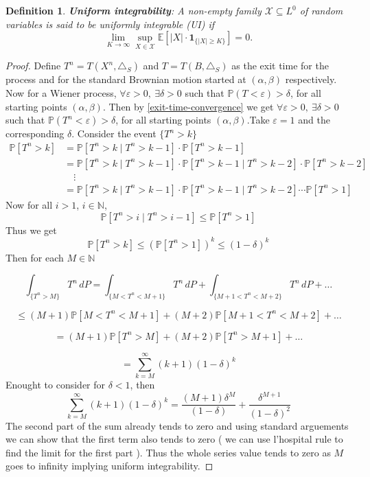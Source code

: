 \documentclass[11pt, a4paper, oneside]{report}
\numberwithin{equation}{section}
\newtheorem{definition}[theorem]{Definition}
\begin{document}
\begin{definition}
\textbf{Uniform integrability}:  
A non-empty family \( \mathcal{X} \subseteq L^0 \)  
of random variables is said to be \emph{uniformly integrable (UI)} if
\[
\lim_{K \to \infty} \sup_{X \in \mathcal{X}} \mathbb{E}\left[ |X| \cdot \mathbf{1}_{\{|X| \geq K\}} \right] = 0.
\]

\end{definition}
\begin{proof}
Define \(T^n=T(X^n,\triangle_S)\) and \(T=T(B,\triangle_S)\) as the exit time for the process and for the standard Brownian motion started at $(\alpha,\beta)$ respectively. Now for a Wiener process, \( \forall \varepsilon > 0, \ \exists \delta > 0 \) such that  
\( \mathbb{P}(T < \varepsilon) > \delta \),  
for all starting points \( (\alpha, \beta) \).
 Then by \ref{exit-time-convergence} we get \( \forall \varepsilon > 0, \ \exists \delta > 0 \) such that \( \mathbb{P}(T^n < \varepsilon) > \delta \), for all starting points \( (\alpha, \beta) \).Take \(\varepsilon =1\) and the corresponding \(\delta \). Consider the event $\{T^n > k\}$
\begin{align*}
\mathbb{P}[T^n > k] 
&= \mathbb{P}[T^n > k \mid T^n > k - 1] \cdot \mathbb{P}[T^n > k - 1] \\
&= \mathbb{P}[T^n > k \mid T^n > k - 1] \cdot \mathbb{P}[T^n > k - 1 \mid T^n > k - 2] \cdot \mathbb{P}[T^n > k - 2] \\
&\quad \vdots \\
&= \mathbb{P}[T^n > k \mid T^n > k - 1] \cdot \mathbb{P}[T^n > k - 1 \mid T^n > k - 2] \cdots \mathbb{P}[T^n > 1]
\end{align*}
\noindent Now for all $i > 1$, $i \in \mathbb{N}$,
\[
\mathbb{P}[T^n > i \mid T^n > i - 1] \leq \mathbb{P}[T^n > 1]
\]
\noindent Thus we get
\[
\mathbb{P}[T^n > k] \leq \left( \mathbb{P}[T^n > 1] \right)^k \leq (1 - \delta)^k
\]
Then for each $M \in \mathbb{N}$

\[
\int_{\{T^n > M\}} T^n \, dP 
= \int_{\{M < T^n < M+1\}} T^n \, dP 
+ \int_{\{M+1 < T^n < M+2\}} T^n \, dP 
+ \ldots
\]

\[
\leq (M+1) \mathbb{P}[M < T^n < M+1] 
+ (M+2) \mathbb{P}[M+1 < T^n < M+2] 
+ \ldots
\]

\[
= (M+1)\mathbb{P}[T^n > M] 
+ (M+2)\mathbb{P}[T^n > M+1] 
+ \ldots
\]

\[
= \sum_{k=M}^{\infty} (k+1)(1 - \delta)^k
\]
\noindent Enought to consider for $\delta < 1$, then 
\[
\sum_{k=M}^{\infty} (k+1)(1 - \delta)^k 
= \frac{(M+1)\delta^M}{(1 - \delta)} 
+ \frac{\delta^{M+1}}{(1 - \delta)^2}
\]
\noindent The second part of the sum already tends to zero and using standard arguements we can show that the first term also tends to zero ( we can use l'hospital rule to find the limit for the first part ). Thus the whole series value tends to zero as $M$ goes to infinity implying uniform integrability.
\end{proof}
\end{document}
